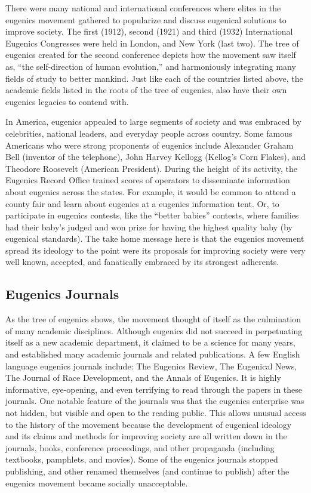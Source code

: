 \documentclass[
  oneside,
  12pt]{crumpbook}
\begin{document}
There were many national and international conferences where elites in the eugenics movement gathered to popularize and discuss eugenical solutions to improve society. The first (1912), second (1921) and third (1932) International Eugenics Congresses were held in London, and New York (last two). The tree of eugenics created for the second conference depicts how the movement saw itself as, ``the self-direction of human evolution,'' and harmoniously integrating many fields of study to better mankind. Just like each of the countries listed above, the academic fields listed in the roots of the tree of eugenics, also have their own eugenics legacies to contend with.

In America, eugenics appealed to large segments of society and was embraced by celebrities, national leaders, and everyday people across country. Some famous Americans who were strong proponents of eugenics include Alexander Graham Bell (inventor of the telephone), John Harvey Kellogg (Kellog's Corn Flakes), and Theodore Roosevelt (American President). During the height of its activity, the Eugenics Record Office trained scores of operators to disseminate information about eugenics across the states. For example, it would be common to attend a county fair and learn about eugenics at a eugenics information tent. Or, to participate in eugenics contests, like the ``better babies'' contests, where families had their baby's judged and won prize for having the highest quality baby (by eugenical standards). The take home message here is that the eugenics movement spread its ideology to the point were its proposals for improving society were very well known, accepted, and fanatically embraced by its strongest adherents.

\hypertarget{eugenics-journals}{%
\subsection{Eugenics Journals}\label{eugenics-journals}}

As the tree of eugenics shows, the movement thought of itself as the culmination of many academic disciplines. Although eugenics did not succeed in perpetuating itself as a new academic department, it claimed to be a science for many years, and established many academic journals and related publications. A few English language eugenics journals include: The Eugenics Review, The Eugenical News, The Journal of Race Development, and the Annals of Eugenics. It is highly informative, eye-opening, and even terrifying to read through the papers in these journals. One notable feature of the journals was that the eugenics enterprise was not hidden, but visible and open to the reading public. This allows unusual access to the history of the movement because the development of eugenical ideology and its claims and methods for improving society are all written down in the journals, books, conference proceedings, and other propaganda (including textbooks, pamphlets, and movies). Some of the eugenics journals stopped publishing, and other renamed themselves (and continue to publish) after the eugenics movement became socially unacceptable.
\end{document}

